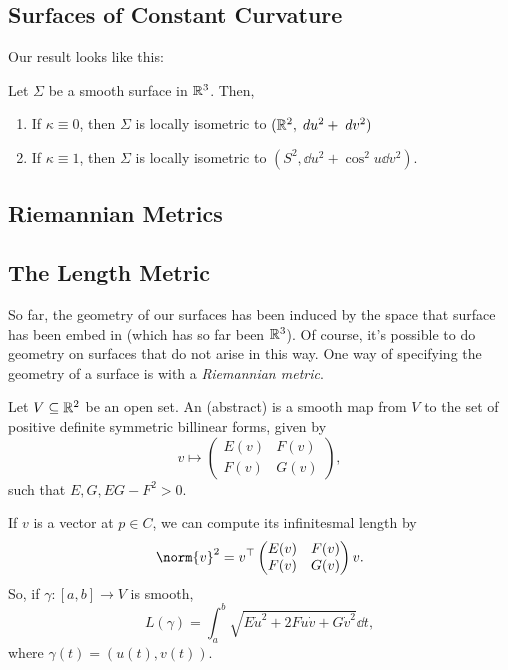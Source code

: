 \documentclass[a4paper]{article}
\begin{document}
\subsection{Surfaces of Constant Curvature}

Our result looks like this:

\begin{proposition}
    Let $\Sigma$ be a smooth surface in $\mathbb{R}^3$. Then,
    \begin{enumerate}[label=(\roman*)]
        \item If $\kappa \equiv 0$, then $\Sigma$ is locally isometric to $(\mathbb{R}^2, \; d u^2 + \; d v^2)$
        \item If $\kappa \equiv 1$, then $\Sigma$ is locally isometric to $(S^2, \dd u^2 + \cos^2 u  \dd v^2)$.
    \end{enumerate}
\end{proposition}

\subsection{Riemannian Metrics}

\subsection{The Length Metric}

So far, the geometry of our surfaces has been induced by the space that surface has been embed in (which has so far been $\mathbb{R}^3$). Of course, it's possible to do geometry on surfaces that do not arise in this way. 
One way of specifying the geometry of a surface is with a \emph{Riemannian metric}.

\begin{definition}
    Let $V \subseteq \mathbb{R}^2$ be an open set. An (abstract)  is a smooth map from $V$ to the set of positive definite symmetric billinear forms, given by
    $$
    v \mapsto \begin{pmatrix}
        E(v) & F(v) \\
        F(v) & G(v)
    \end{pmatrix},
    $$
    such that $E, G, EG - F^2 > 0$.
\end{definition}

If $v$ is a vector at $p \in C$, we can compute its infinitesmal length by
$$
\norm{v}^2 = v^\top \begin{pmatrix}
    E(v) & F(v) \\ F(v) & G(v)
\end{pmatrix} v.
$$
So, if $\gamma: [a, b] \rightarrow V$ is smooth,
$$
L(\gamma) = \int_a^b \sqrt{E \dot{u}^2 + 2F \dot{u}\dot{v} + G \dot{v}^2} \dd t,
$$
where $\gamma(t) = (u(t), v(t))$.



\end{document}
